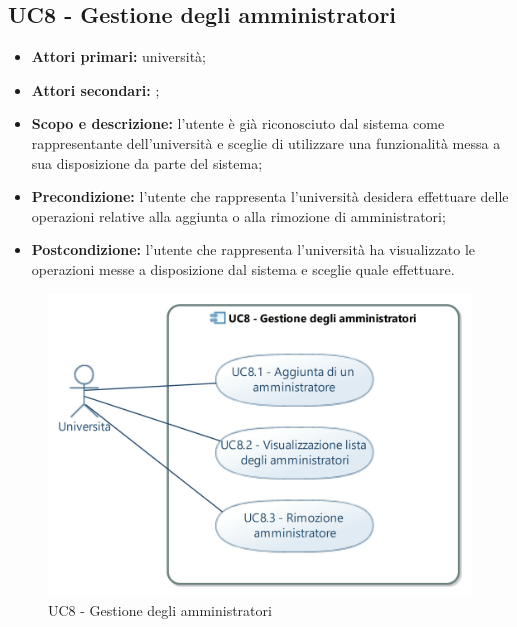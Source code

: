 \documentclass[AnalisiDeiRequisiti.tex]{subfiles}
\begin{document}
\subsection{UC8 - Gestione degli amministratori}
\begin{itemize}
	\item \textbf{Attori primari:} università;\\
	\item \textbf{Attori secondari:} ;
	\item \textbf{Scopo e descrizione:} l'utente è già riconosciuto dal sistema come rappresentante dell'università e sceglie di utilizzare una funzionalità messa a sua disposizione da parte del sistema;\\
	\item \textbf{Precondizione:} l'utente che rappresenta l'università desidera effettuare delle operazioni relative alla aggiunta o alla rimozione di amministratori;\\
	\item \textbf{Postcondizione:} l'utente che rappresenta l'università ha visualizzato le operazioni messe a disposizione dal sistema e sceglie quale effettuare.\\
\end{itemize}

\begin{figure}[H]
	\centering
	\includegraphics[width=1.0\linewidth]{UC8.jpg}
	\caption{UC8 - Gestione degli amministratori}
	\label{fig:UC8 - Gestione degli amministratori}
\end{figure}
\end{document}
